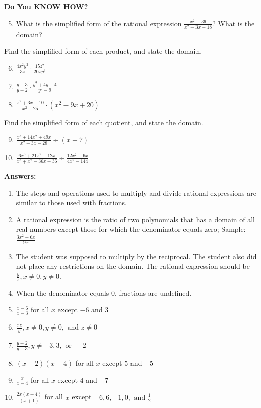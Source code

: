 \documentclass{article}
\newenvironment{concept-summary}{}{}
\begin{document}
\begin{concept-summary}
\textbf{Do You KNOW HOW?}
\begin{enumerate}
\setcounter{enumi}{4}
    \item What is the simplified form of the rational expression $\frac{x^2-36}{x^2+3x-18}$? What is the domain?
\end{enumerate}
Find the simplified form of each product, and state the domain.
\begin{enumerate}
\setcounter{enumi}{5}
    \item $\frac{4x^2y^2}{3z} \cdot \frac{15z^2}{20xy^3}$
    \item $\frac{y+3}{y+2} \cdot \frac{y^2+4y+4}{y^2-9}$
    \item $\frac{x^2+3x-10}{x^2-25} \cdot (x^2-9x+20)$
\end{enumerate}
Find the simplified form of each quotient, and state the domain.
\begin{enumerate}
\setcounter{enumi}{8}
    \item $\frac{x^3+14x^2+49x}{x^2+3x-28} \div (x+7)$
    \item $\frac{6x^3+21x^2-12x}{x^3+x^2-36x-36} \div \frac{12x^2-6x}{4x^2-144}$
\end{enumerate}

\textbf{Answers:}
\begin{enumerate}
    \item The steps and operations used to multiply and divide rational expressions are similar to those used with fractions.
    \item A rational expression is the ratio of two polynomials that has a domain of all real numbers except those for which the denominator equals zero; Sample: $\frac{3x^2 + 6x}{9x}$
    \item The student was supposed to multiply by the reciprocal. The student also did not place any restrictions on the domain. The rational expression should be $\frac{y}{x}, x \neq 0, y \neq 0$.
    \item When the denominator equals 0, fractions are undefined.
    \item $\frac{x-6}{x-3}$ for all $x$ except $-6$ and $3$
    \item $\frac{xz}{y}, x \neq 0, y \neq 0, \text{ and } z \neq 0$
    \item $\frac{y+2}{y-3}, y \neq -3, 3, \text{ or } -2$
    \item $(x-2)(x - 4)$ for all $x$ except $5$ and $-5$
    \item $\frac{x}{x-4}$ for all $x$ except $4$ and $-7$
    \item $\frac{2x(x+4)}{(x+1)}$ for all $x$ except $-6, 6, -1, 0, \text{ and } \frac{1}{2}$
\end{enumerate}
\end{concept-summary}
\end{document}
